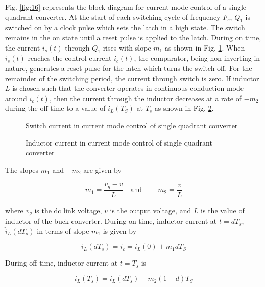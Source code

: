 \documentclass[a4paper]{IEEEtran}
\begin{document}
	Fig. \ref{fig:16} represents the block diagram for current mode control of a single quadrant converter. At the start of each switching cycle of frequency $F_s$, $Q_1$ is switched on by a clock pulse which sets the latch in a high state. The switch remains in the on state until a reset pulse is applied to the latch. During on time, the current $i_s(t)$ through $Q_1$ rises with slope $m_1$ as shown in Fig. \ref{fig:17}. When $i_s(t)$ reaches the control current $i_c(t)$, the comparator, being non inverting in nature, generates a reset pulse for the latch which turns the switch off. For the remainder of the switching period, the current through switch is zero. If inductor $L$ is chosen such that the converter operates in continuous conduction mode around $i_c(t)$, then the current through the inductor decreases at a rate of $-m_2$ during the off time to a value of $i_L(T_S)$ at $T_s$ as shown in Fig. \ref{fig:18}.

	\begin{figure}
		\centering
		
		\caption{Switch current in current mode control of single quadrant converter}
		\label{fig:17}
	\end{figure}

	\begin{figure}
		\centering
		
		\caption{Inductor current in current mode control of single quadrant converter}
		\label{fig:18}
	\end{figure}

	The slopes $m_1$ and $-m_2$ are given by

	\begin{align}
		m_1 = \dfrac{v_g-v}{L} \quad \text{and} \quad  -m_2=\dfrac{v}{L}
		\label{eq:1}
	\end{align}

	where $v_g$ is the dc link voltage, $v$ is the output voltage, and $L$ is the value of inductor of the buck converter.
	During on time, inductor current at $t=dT_s$, $\hat{i}_L(dT_s)$ in terms of slope $m_1$ is given by
	
	\begin{equation}
		i_L(dT_s) = i_c = i_L(0)+m_1dT_S
		\label{eq:2}
	\end{equation}

	During off time, inductor current at $t=T_s$ is 

	\begin{equation*}
		i_L(T_s) = i_L(dT_s) - m_2(1-d)T_S
	\end{equation*}
\end{document}
